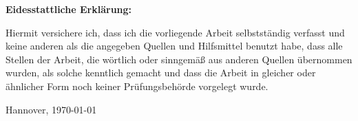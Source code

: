 \newpage
\thispagestyle{empty}
\vspace*{\fill}
\bfseries Eidesstattliche Erklärung:
\normalfont

Hiermit versichere ich, dass ich die vorliegende Arbeit selbstständig verfasst und keine anderen als die angegeben Quellen und Hilfsmittel benutzt habe, dass alle Stellen der Arbeit, die wörtlich oder sinngemäß aus anderen Quellen übernommen wurden, als solche kenntlich gemacht und dass die Arbeit in gleicher oder ähnlicher Form noch keiner Prüfungsbehörde vorgelegt wurde.

\vspace{16mm}
Hannover, \today{}
